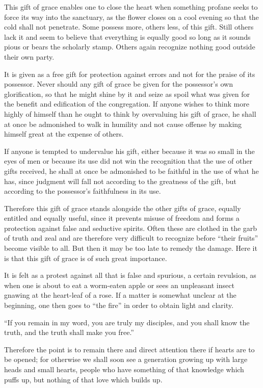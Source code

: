 This gift of grace enables one to close the heart when something profane seeks to force its way into the sanctuary, as the flower closes on a cool evening so that the cold shall not penetrate. Some possess more, others less, of this gift. Still others lack it and seem to believe that everything is equally good so long as it sounds pious or bears the scholarly stamp. Others again recognize nothing good outside their own party.

It is given as a free gift for protection against errors and not for the praise of its possessor. Never should any gift of grace be given for the possessor’s own glorification, so that he might shine by it and seize as spoil what was given for the benefit and edification of the congregation. If anyone wishes to think more highly of himself than he ought to think by overvaluing his gift of grace, he shall at once be admonished to walk in humility and not cause offense by making himself great at the expense of others.

If anyone is tempted to undervalue his gift, either because it was so small in the eyes of men or because its use did not win the recognition that the use of other gifts received, he shall at once be admonished to be faithful in the use of what he has, since judgment will fall not according to the greatness of the gift, but according to the possessor’s faithfulness in its use.

Therefore this gift of grace stands alongside the other gifts of grace, equally entitled and equally useful, since it prevents misuse of freedom and forms a protection against false and seductive spirits. Often these are clothed in the garb of truth and zeal and are therefore very difficult to recognize before “their fruits” become visible to all. But then it may be too late to remedy the damage. Here it is that this gift of grace is of such great importance.

It is felt as a protest against all that is false and spurious, a certain revulsion, as when one is about to eat a worm-eaten apple or sees an unpleasant insect gnawing at the heart-leaf of a rose. If a matter is somewhat unclear at the beginning, one then goes to “the fire” in order to obtain light and clarity.

“If you remain in my word, you are truly my disciples, and you shall know the truth, and the truth shall make you free.”

Therefore the point is to remain there and direct attention there if hearts are to be opened; for otherwise we shall soon see a generation growing up with large heads and small hearts, people who have something of that knowledge which puffs up, but nothing of that love which builds up.

